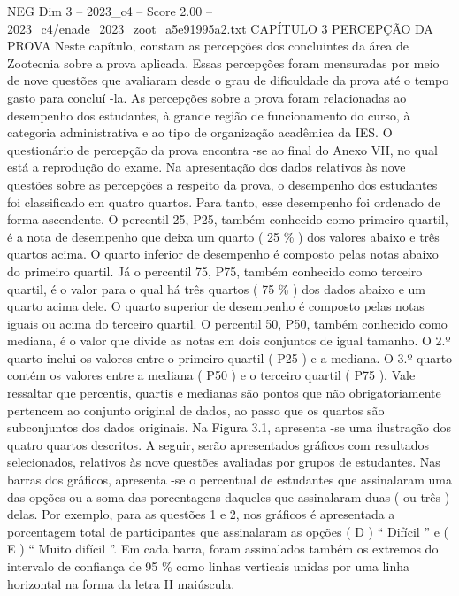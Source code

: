 \begin{textsample}{NEG Dim 3 – 2023\_c4 – Score 2.00 – 2023\_c4/enade\_2023\_zoot\_a5e91995a2.txt}  \label{ex:f3_neg_213}
CAPÍTULO 3 PERCEPÇÃO DA PROVA Neste capítulo, constam as percepções dos concluintes da área de Zootecnia sobre a prova aplicada.
Essas percepções foram mensuradas por meio de nove questões que avaliaram desde o grau de dificuldade da prova até o tempo gasto para concluí -la.
As percepções sobre a prova foram relacionadas ao desempenho dos estudantes, à grande região de funcionamento do curso, à categoria administrativa e ao tipo de organização acadêmica da IES.
O questionário de percepção da prova encontra -se ao final do Anexo VII, no qual está a reprodução do exame.
Na apresentação dos dados relativos às nove questões sobre as percepções a respeito da prova, o desempenho dos estudantes foi classificado em quatro quartos.
Para tanto, esse desempenho foi ordenado de forma ascendente.
O percentil 25, P25, também conhecido como primeiro quartil, é a nota de desempenho que deixa um quarto ( 25 \% ) dos valores abaixo e três quartos acima.
O quarto inferior de desempenho é composto pelas notas abaixo do primeiro quartil.
Já o percentil 75, P75, também conhecido como terceiro quartil, é o valor para o qual há três quartos ( 75 \% ) dos dados abaixo e um quarto acima dele.
O quarto superior de desempenho é composto pelas notas iguais ou acima do terceiro quartil.
O percentil 50, P50, também conhecido como mediana, é o valor que divide as notas em dois conjuntos de igual tamanho.
O 2.º quarto inclui os valores entre o primeiro quartil ( P25 ) e a mediana.
O 3.º quarto contém os valores entre a mediana ( P50 ) e o terceiro quartil ( P75 ).
Vale ressaltar que percentis, quartis e medianas são pontos que não obrigatoriamente pertencem ao conjunto original de dados, ao passo que os quartos são subconjuntos dos dados originais.
Na Figura 3.1, apresenta -se uma ilustração dos quatro quartos descritos.
A seguir, serão apresentados gráficos com resultados selecionados, relativos às nove questões avaliadas por grupos de estudantes.
Nas barras dos gráficos, apresenta -se o percentual de estudantes que assinalaram uma das opções ou a soma das porcentagens daqueles que assinalaram duas ( ou três ) delas.
Por exemplo, para as questões 1 e 2, nos gráficos é apresentada a porcentagem total de participantes que assinalaram as opções ( D ) “ Difícil ” e ( E ) “ Muito difícil ”.
Em cada barra, foram assinalados também os extremos do intervalo de confiança de 95 \% como linhas verticais unidas por uma linha horizontal na forma da letra H maiúscula.

\end{textsample}
